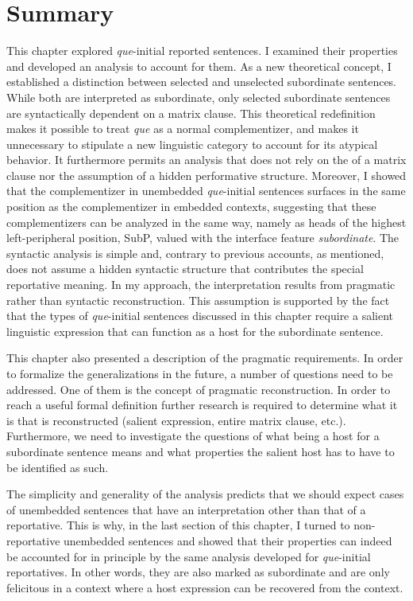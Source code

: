 \section{Summary}
This chapter explored   \emph{que}-initial reported sentences. I examined their properties and developed an analysis to account for them. As a  new theoretical concept, I established a distinction between  selected and  unselected subordinate sentences. While both are interpreted as subordinate, only  selected subordinate sentences are syntactically dependent on a matrix clause.  This theoretical redefinition  makes it possible to treat \emph{que} as a normal complementizer, and makes it unnecessary to  stipulate a new linguistic category to account for its atypical behavior. It furthermore permits an analysis that does not rely on the  of a matrix clause nor the assumption of a hidden performative structure.
Moreover, I showed that the complementizer in unembedded \emph{que}-initial  sentences surfaces in the same  position as the complementizer  in embedded contexts, suggesting that these complementizers can be analyzed in the same way, namely as heads of the highest left-peripheral position, SubP,  valued with the interface feature \emph{subordinate}. 
The syntactic analysis is  simple and, contrary to  previous accounts,  as mentioned, does not assume a hidden syntactic structure that  contributes the special reportative meaning. 
In my approach, the interpretation results from pragmatic rather than syntactic reconstruction. This assumption is supported by the fact that the types of \emph{que}-initial sentences discussed in this chapter require a salient linguistic expression that can function as a host for the subordinate sentence. 


This chapter also presented a description of the pragmatic requirements. In order to formalize the generalizations in the future,  a number of questions need to be addressed. One of them is the concept of pragmatic reconstruction. In order to reach a useful formal definition further research is required  to determine what it is that is reconstructed (salient expression, entire matrix clause, etc.). Furthermore,  we need to investigate the questions of what being a host for a subordinate sentence means and what properties  the salient host has to have to be identified as such. 

The simplicity and
generality of the analysis predicts that we should expect cases of unembedded sentences that
have an interpretation other than that of a reportative. This is why,  in the last section of this chapter, I turned to non-reportative unembedded sentences and showed that their properties can indeed
be accounted for in principle by the same analysis developed for \emph{que}-initial reportatives. In other words,
they are also  marked as subordinate and are only felicitous in a context where a
 host expression can be recovered from the context.

